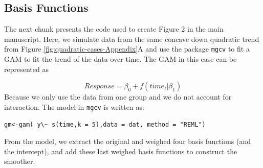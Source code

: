 \documentclass[
]{article}
\newcommand{\passthrough}[1]{#1}
\begin{document}
\hypertarget{basis-functions}{%
\subsection{Basis Functions}\label{basis-functions}}

The next chunk presents the code used to create Figure 2 in the main manuscript. Here, we simulate data from the same concave down quadratic trend from Figure \ref{fig:quadratic-cases-Appendix}A and use the package \passthrough{\lstinline!mgcv!} to fit a GAM to fit the trend of the data over time. The GAM in this case can be represented as

\[Response= \beta_0 + f(time_t|\beta_1)\]
Because we only use the data from one group and we do not account for interaction. The model in \passthrough{\lstinline!mgcv!} is written as:

\passthrough{\lstinline!gm<-gam( y\~ s(time,k = 5),data = dat, method = "REML")!}

From the model, we extract the original and weighed four basis functions (and the intercept), and add these last weighed basis functions to construct the smoother.
\end{document}
